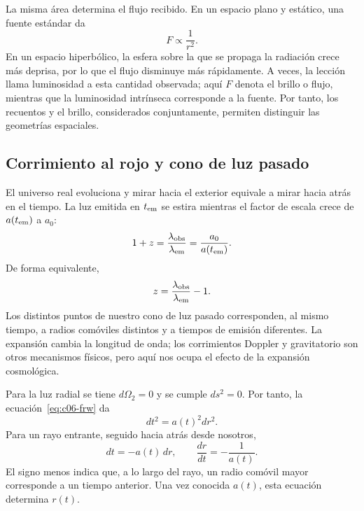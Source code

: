 La misma área determina el flujo recibido. En un espacio plano y estático, una fuente estándar da
\begin{equation}
F\propto\frac{1}{r^2}.
\end{equation}
En un espacio hiperbólico, la esfera sobre la que se propaga la radiación crece más deprisa, por lo que el flujo disminuye más rápidamente. A veces, la lección llama luminosidad a esta cantidad observada; aquí \(F\) denota el brillo o flujo, mientras que la luminosidad intrínseca corresponde a la fuente. Por tanto, los recuentos y el brillo, considerados conjuntamente, permiten distinguir las geometrías espaciales.

\subsection{Corrimiento al rojo y cono de luz pasado}

El universo real evoluciona y mirar hacia el exterior equivale a mirar hacia atrás en el tiempo. La luz emitida en \(t_{\rm em}\) se estira mientras el factor de escala crece de \(a(t_{\rm em})\) a \(a_0\):
\begin{equation}
1+z
=\frac{\lambda_{\rm obs}}{\lambda_{\rm em}}
=\frac{a_0}{a(t_{\rm em})}.
\label{eq:c06-redshift}
\end{equation}
De forma equivalente,
\begin{equation}
z=\frac{\lambda_{\rm obs}}{\lambda_{\rm em}}-1.
\end{equation}
Los distintos puntos de nuestro cono de luz pasado corresponden, al mismo tiempo, a radios comóviles distintos y a tiempos de emisión diferentes. La expansión cambia la longitud de onda; los corrimientos Doppler y gravitatorio son otros mecanismos físicos, pero aquí nos ocupa el efecto de la expansión cosmológica.

\begin{classroomqa}
\end{classroomqa}

Para la luz radial se tiene \(d\Omega_2=0\) y se cumple \(ds^2=0\). Por tanto, la ecuación~\eqref{eq:c06-frw} da
\begin{equation}
dt^2=a(t)^2dr^2.
\end{equation}
Para un rayo entrante, seguido hacia atrás desde nosotros,
\begin{equation}
dt=-a(t)\,dr,
\qquad
\frac{dr}{dt}=-\frac{1}{a(t)}.
\label{eq:c06-null-ray}
\end{equation}
El signo menos indica que, a lo largo del rayo, un radio comóvil mayor corresponde a un tiempo anterior. Una vez conocida \(a(t)\), esta ecuación determina \(r(t)\).

